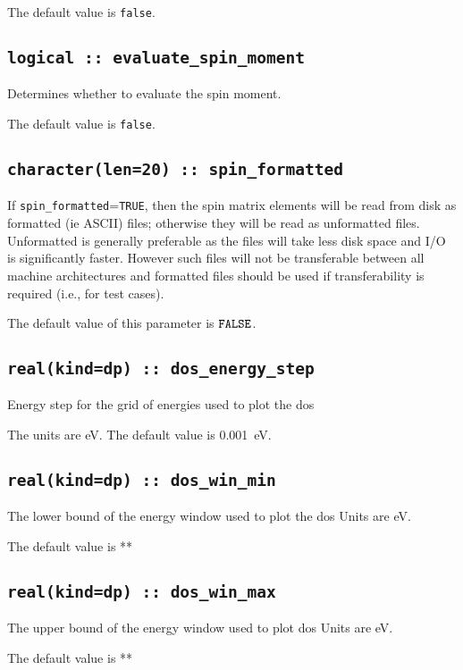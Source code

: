 The default value is \verb#false#.


\subsection[evaluate\_spin\_moment]{\tt logical :: evaluate\_spin\_moment}
Determines whether to evaluate the spin moment.

The default value is \verb#false#.

\subsection[spin\_formated]{\tt character(len=20) :: spin\_formatted}

If \verb#spin_formatted#=\verb#TRUE#, then the spin matrix elements will be
read from disk as formatted (ie ASCII) files; otherwise they will be
read as unformatted files. Unformatted is generally preferable as the
files will take less disk space and I/O is significantly
faster. However such files will not be transferable between all
machine architectures and formatted files should be used if
transferability is required (i.e., for test cases).

The default value of this parameter is $\verb#FALSE#$.

\subsection[berry\_energy\_step]{\tt real(kind=dp) :: dos\_energy\_step}
Energy step for the grid of energies used to plot the dos

The units are eV.
The default value is 0.001~eV.

\subsection[dos\_win\_min]{\tt real(kind=dp) :: dos\_win\_min}
The lower bound of the energy window  used to plot the dos
Units are eV.

The default value is **

\subsection[dos\_win\_max]{\tt real(kind=dp) :: dos\_win\_max}
The upper bound of the energy window used to plot dos
Units are eV.

The default value is **



\clearpage
